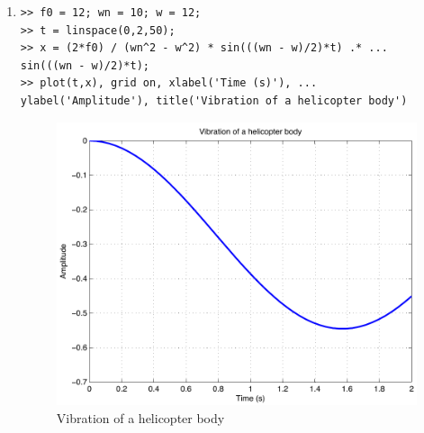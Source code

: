 \begin{enumerate}
\clearpage
\item
\begin{lstlisting}
>> f0 = 12; wn = 10; w = 12;
>> t = linspace(0,2,50);
>> x = (2*f0) / (wn^2 - w^2) * sin(((wn - w)/2)*t) .* ...
sin(((wn - w)/2)*t);
>> plot(t,x), grid on, xlabel('Time (s)'), ...
ylabel('Amplitude'), title('Vibration of a helicopter body')
\end{lstlisting}
\begin{figure}[h]
	\myfloatalign
	\includegraphics[width=\linewidth]{Graphics/Additional-Ex/heli-vib-plot}
	\caption{Vibration of a helicopter body}
	\label{fig:heli-vib-plot}
\end{figure}


\end{enumerate}
